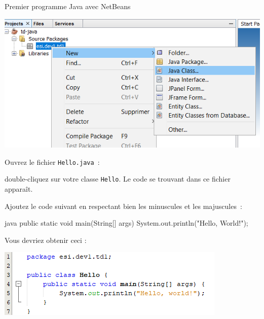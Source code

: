 \documentclass[a4paper,11pt]{article}
\begin{document}
\begin{Tutoriel}{Premier programme Java avec NetBeans}
\begin{steps}
			\bigskip
			
			\begin{center}
				\includegraphics[width=\textwidth]{images/nb_newproject_new_class}
			\end{center}


		\item Ouvrez le fichier \texttt{Hello.java}~:
		
			double-cliquez sur votre classe \texttt{Hello}. 
			Le code se trouvant dans ce fichier apparaît.
			
%			
%			
			
			Ajoutez le code suivant en respectant bien les 
			minuscules et les majuscules~:
	
			\begin{Code}{java}
				public static void main(String[] args) {
					System.out.println("Hello, World!");
				}
			\end{Code}
			
			Vous devriez obtenir ceci :
			
			\begin{center}
				\includegraphics{images/nb_newproject_code}
			\end{center}
			

\end{steps}
\end{Tutoriel}
\end{document}
